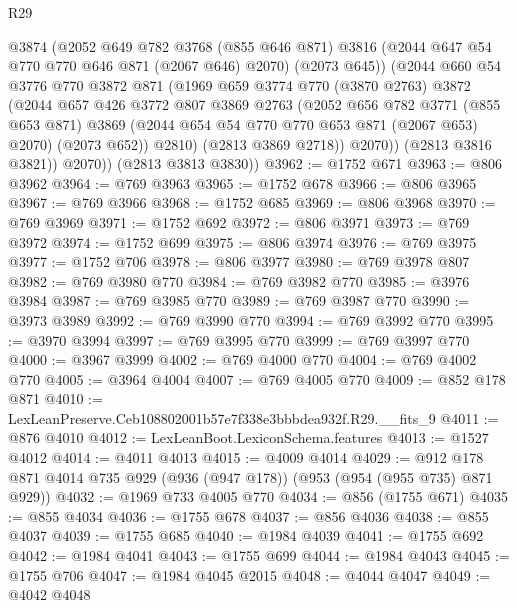 \begin{lexlean}{R29}
\begin{coremodule}
              @3874
              (@2052
                @649
                @782
                @3768
                (@855 @646 @871)
                @3816
                (@2044 @647 @54 @770 @770 @646 @871 (@2067 @646) @2070)
                (@2073 @645))
              (@2044
                @660
                @54
                @3776
                @770
                @3872
                @871
                (@1969
                  @659
                  @3774
                  @770
                  (@3870 @2763)
                  @3872
                  (@2044
                    @657
                    @426
                    @3772
                    @807
                    @3869
                    @2763
                    (@2052
                      @656
                      @782
                      @3771
                      (@855 @653 @871)
                      @3869
                      (@2044 @654 @54 @770 @770 @653 @871 (@2067 @653) @2070)
                      (@2073 @652))
                    @2810)
                  (@2813 @3869 @2718))
                @2070))
            (@2813 @3816 @3821))
          @2070))
      (@2813 @3813 @3830))
@3962 := @1752 @671
@3963 := @806 @3962
@3964 := @769 @3963
@3965 := @1752 @678
@3966 := @806 @3965
@3967 := @769 @3966
@3968 := @1752 @685
@3969 := @806 @3968
@3970 := @769 @3969
@3971 := @1752 @692
@3972 := @806 @3971
@3973 := @769 @3972
@3974 := @1752 @699
@3975 := @806 @3974
@3976 := @769 @3975
@3977 := @1752 @706
@3978 := @806 @3977
@3980 := @769 @3978 @807
@3982 := @769 @3980 @770
@3984 := @769 @3982 @770
@3985 := @3976 @3984
@3987 := @769 @3985 @770
@3989 := @769 @3987 @770
@3990 := @3973 @3989
@3992 := @769 @3990 @770
@3994 := @769 @3992 @770
@3995 := @3970 @3994
@3997 := @769 @3995 @770
@3999 := @769 @3997 @770
@4000 := @3967 @3999
@4002 := @769 @4000 @770
@4004 := @769 @4002 @770
@4005 := @3964 @4004
@4007 := @769 @4005 @770
@4009 := @852 @178 @871
@4010 := LexLeanPreserve.Ceb108802001b57e7f338e3bbbdea932f.R29.__fits_9
@4011 := @876 @4010
@4012 := LexLeanBoot.LexiconSchema.features
@4013 := @1527 @4012
@4014 := @4011 @4013
@4015 := @4009 @4014
@4029 := @912 @178 @871 @4014 @735 @929 (@936 (@947 @178)) (@953 (@954 (@955 @735) @871 @929))
@4032 := @1969 @733 @4005 @770
@4034 := @856 (@1755 @671)
@4035 := @855 @4034
@4036 := @1755 @678
@4037 := @856 @4036
@4038 := @855 @4037
@4039 := @1755 @685
@4040 := @1984 @4039
@4041 := @1755 @692
@4042 := @1984 @4041
@4043 := @1755 @699
@4044 := @1984 @4043
@4045 := @1755 @706
@4047 := @1984 @4045 @2015
@4048 := @4044 @4047
@4049 := @4042 @4048

\end{coremodule}
\end{lexlean}
